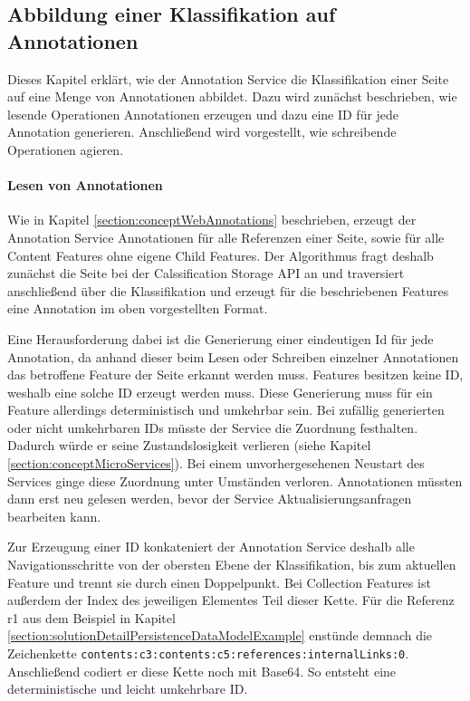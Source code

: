 \subsection{Abbildung einer Klassifikation auf Annotationen}
    \label{section:solutionDetailsAnnotationServiceMapping}
    Dieses Kapitel erklärt, wie der Annotation Service
    die Klassifikation einer Seite auf eine Menge von Annotationen abbildet.
    Dazu wird zunächst beschrieben, wie lesende Operationen Annotationen
    erzeugen und dazu eine ID für jede Annotation generieren.
    Anschließend wird vorgestellt, wie schreibende Operationen agieren.

    \paragraph{Lesen von Annotationen}
    Wie in Kapitel \ref{section:conceptWebAnnotations} beschrieben,
    erzeugt der Annotation Service Annotationen für alle Referenzen einer Seite,
    sowie für alle Content Features ohne eigene Child Features.
    Der Algorithmus fragt deshalb zunächst die Seite bei der Calssification Storage API an
    und traversiert anschließend über die Klassifikation und erzeugt
    für die beschriebenen Features eine Annotation im oben vorgestellten Format.

    Eine Herausforderung dabei ist die Generierung einer eindeutigen Id für jede Annotation,
    da anhand dieser beim Lesen oder Schreiben einzelner Annotationen das betroffene
    Feature der Seite erkannt werden muss.
    Features besitzen keine ID, weshalb eine solche ID erzeugt werden muss.
    Diese Generierung muss für ein Feature allerdings deterministisch und umkehrbar sein.
    Bei zufällig generierten oder nicht umkehrbaren IDs müsste der Service
    die Zuordnung festhalten.
    Dadurch würde er seine Zustandslosigkeit verlieren (siehe Kapitel \ref{section:conceptMicroServices}).
    Bei einem unvorhergesehenen Neustart des Services ginge diese Zuordnung unter Umständen verloren.
    Annotationen müssten dann erst neu gelesen werden,
    bevor der Service Aktualisierungsanfragen bearbeiten kann.

    Zur Erzeugung einer ID konkateniert der Annotation Service deshalb
    alle Navigationsschritte von der obersten Ebene der Klassifikation,
    bis zum aktuellen Feature und trennt sie durch einen Doppelpunkt.
    Bei Collection Features ist außerdem der Index des jeweiligen Elementes Teil dieser Kette.
    Für die Referenz r1 aus dem Beispiel in Kapitel \ref{section:solutionDetailPersistenceDataModelExample}
    enstünde demnach die Zeichenkette \texttt{contents:c3:contents:c5:references:internalLinks:0}.
    Anschließend codiert er diese Kette noch mit Base64.
    So entsteht eine deterministische und leicht umkehrbare ID.


